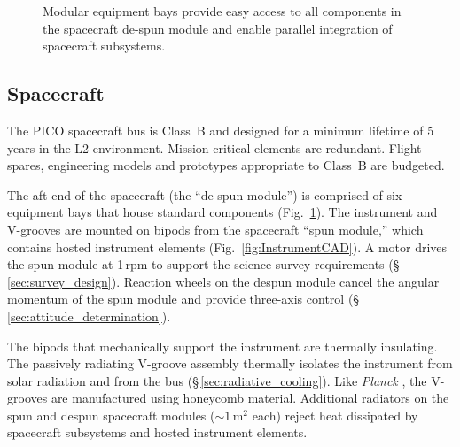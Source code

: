 \begin{figure}
\hspace{-0.15in}
\parbox{5.1in}{ }
\hspace{0.12in}
\parbox{1.3in}{
\caption{\captiontext
Modular equipment bays provide easy access to all components in the spacecraft de-spun module and enable parallel integration of spacecraft subsystems.\label{fig:Spacecraft}} }
\vspace{-0.25in}
\end{figure}

\subsection{Spacecraft}
\label{sec:spacecraft} %

The PICO spacecraft bus is Class~B and designed for a minimum lifetime of 5\,years in the L2
environment. Mission critical elements are redundant. Flight spares,
engineering models and prototypes appropriate to Class~B are budgeted.

The aft end of the spacecraft (the ``de-spun module'') is comprised of
six equipment bays that house standard components
(Fig.~\ref{fig:Spacecraft}).  The instrument and V-grooves are mounted on
bipods from the spacecraft ``spun module,'' which contains hosted
instrument elements (Fig.~\ref{fig:InstrumentCAD}). A motor drives the
spun module at 1\,rpm to support the science survey requirements
(\S\,\ref{sec:survey_design}). Reaction wheels on the despun module
cancel the angular momentum of the spun module and provide three-axis
control (\S\,\ref{sec:attitude_determination}).

The bipods that mechanically support the instrument are thermally
insulating. The passively radiating V-groove assembly thermally
isolates the instrument from solar radiation and from the bus
(\S\,\ref{sec:radiative_cooling}). Like \textit{Planck} \citep{Tauber2010}, the V-grooves are
manufactured using honeycomb material. Additional radiators on the
spun and despun spacecraft modules ($\sim1$\,m$^2$ each) reject heat
dissipated by spacecraft subsystems and hosted instrument elements.


